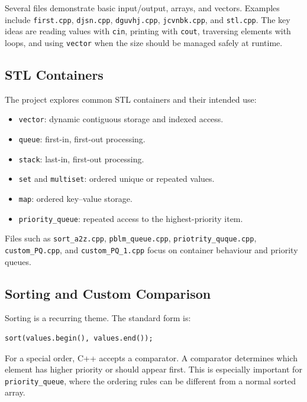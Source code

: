\documentclass[12pt,a4paper]{article}
\begin{document}
Several files demonstrate basic input/output, arrays, and vectors. Examples
include \texttt{first.cpp}, \texttt{djsn.cpp}, \texttt{dguvhj.cpp},
\texttt{jcvnbk.cpp}, and \texttt{stl.cpp}. The key ideas are reading values
with \texttt{cin}, printing with \texttt{cout}, traversing elements with loops,
and using \texttt{vector} when the size should be managed safely at runtime.

\subsection{STL Containers}

The project explores common STL containers and their intended use:

\begin{itemize}
    \item \texttt{vector}: dynamic contiguous storage and indexed access.
    \item \texttt{queue}: first-in, first-out processing.
    \item \texttt{stack}: last-in, first-out processing.
    \item \texttt{set} and \texttt{multiset}: ordered unique or repeated values.
    \item \texttt{map}: ordered key--value storage.
    \item \texttt{priority\_queue}: repeated access to the highest-priority item.
\end{itemize}

Files such as \texttt{sort\_a2z.cpp}, \texttt{pblm\_queue.cpp},
\texttt{priotrity\_quque.cpp}, \texttt{custom\_PQ.cpp}, and
\texttt{custom\_PQ\_1.cpp} focus on container behaviour and priority queues.

\subsection{Sorting and Custom Comparison}

Sorting is a recurring theme. The standard form is:

\begin{verbatim}
sort(values.begin(), values.end());
\end{verbatim}

For a special order, C++ accepts a comparator. A comparator determines which
element has higher priority or should appear first. This is especially important
for \texttt{priority\_queue}, where the ordering rules can be different from a
normal sorted array.
\end{document}
